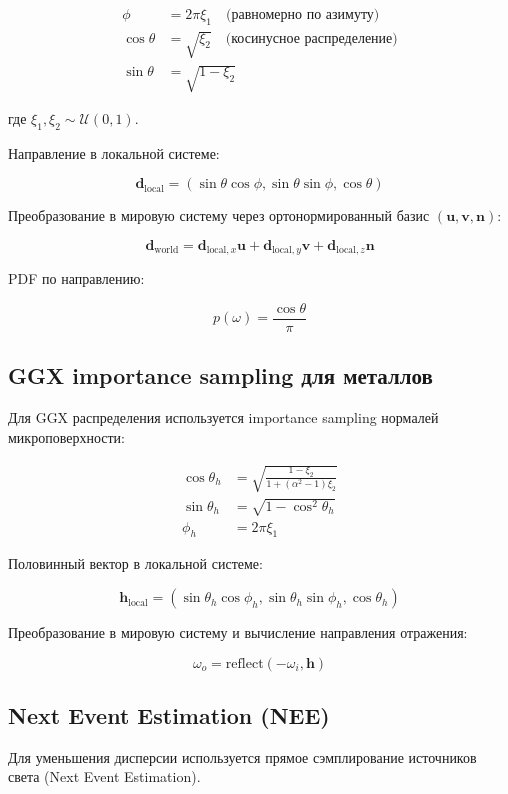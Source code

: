 \documentclass[14pt, a4paper]{extarticle}
\begin{document}
\begin{align}
\phi &= 2\pi \xi_1 \quad \text{(равномерно по азимуту)} \\
\cos\theta &= \sqrt{\xi_2} \quad \text{(косинусное распределение)} \\
\sin\theta &= \sqrt{1 - \xi_2}
\end{align}

где $\xi_1, \xi_2 \sim \mathcal{U}(0, 1)$.

Направление в локальной системе:

\[
\mathbf{d}_{\text{local}} = (\sin\theta \cos\phi, \sin\theta \sin\phi, \cos\theta)
\]

Преобразование в мировую систему через ортонормированный базис $(\mathbf{u}, \mathbf{v}, \mathbf{n})$:

\[
\mathbf{d}_{\text{world}} = \mathbf{d}_{\text{local},x} \mathbf{u} + \mathbf{d}_{\text{local},y} \mathbf{v} + \mathbf{d}_{\text{local},z} \mathbf{n}
\]

PDF по направлению:

\[
p(\omega) = \frac{\cos\theta}{\pi}
\]

\subsection{GGX importance sampling для металлов}

Для GGX распределения используется importance sampling нормалей микроповерхности:

\begin{align}
\cos\theta_h &= \sqrt{\frac{1 - \xi_2}{1 + (\alpha^2 - 1)\xi_2}} \\
\sin\theta_h &= \sqrt{1 - \cos^2\theta_h} \\
\phi_h &= 2\pi \xi_1
\end{align}

Половинный вектор в локальной системе:

\[
\mathbf{h}_{\text{local}} = (\sin\theta_h \cos\phi_h, \sin\theta_h \sin\phi_h, \cos\theta_h)
\]

Преобразование в мировую систему и вычисление направления отражения:

\[
\omega_o = \text{reflect}(-\omega_i, \mathbf{h})
\]

\subsection{Next Event Estimation (NEE)}

Для уменьшения дисперсии используется прямое сэмплирование источников света (Next Event Estimation).
\end{document}
